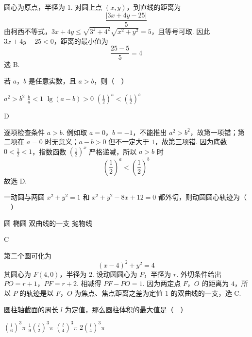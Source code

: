 \documentclass[UTF8,a4paper,oneside,11pt]{ctexbook}
\begin{document}
\begin{solution}
圆心为原点，半径为 \(1\). 对圆上点 \((x,y)\)，到直线的距离为
\[
\frac{|3x+4y-25|}{5}
\]
由柯西不等式，\(3x+4y\leq\sqrt{3^2+4^2}\sqrt{x^2+y^2}=5\)，且等号可取. 因此 \(3x+4y-25<0\)，距离的最小值为
\[
\frac{25-5}{5}=4
\]
选 B.
\end{solution}

\begin{problem}
若 \(a\)，\(b\) 是任意实数，且 \(a>b\)，则（\(\quad\)）

\choices
    {\(a^2>b^2\)}
    {\(\frac{b}{a}<1\)}
    {\(\lg \left(a-b\right)>0\)}
    {\(\left(\frac{1}{2}\right)^a<\left(\frac{1}{2}\right)^b\)}
\end{problem}

\begin{answer}
D
\end{answer}

\begin{solution}
逐项检查条件 \(a>b\). 例如取 \(a=0\)，\(b=-1\)，不能推出 \(a^2>b^2\)，故第一项错；第二项在 \(a=0\) 时无意义；\(a-b>0\) 但不一定大于 \(1\)，故第三项错. 因为底数 \(0<\frac12<1\)，指数函数 \(\left(\frac12\right)^x\) 严格递减，所以 \(a>b\) 时
\[
\left(\frac12\right)^a<\left(\frac12\right)^b
\]
故选 D.
\end{solution}

\begin{problem}
一动圆与两圆 \(x^2+y^2=1\) 和 \(x^2+y^2-8x+12=0\) 都外切，则动圆圆心轨迹为（\(\quad\)）

\choices
    {圆}
    {椭圆}
    {双曲线的一支}
    {抛物线}
\end{problem}

\begin{answer}
C
\end{answer}

\begin{solution}
第二个圆可化为
\[
(x-4)^2+y^2=4
\]
其圆心为 \(F(4,0)\)，半径为 \(2\). 设动圆圆心为 \(P\)，半径为 \(r\). 外切条件给出
\(PO=r+1\)，\(PF=r+2\).
相减得 \(PF-PO=1\). 因为两定点 \(F\)，\(O\) 的距离为 \(4\)，所以 \(P\) 的轨迹是以 \(F\)，\(O\) 为焦点、焦点距离之差为定值 \(1\) 的双曲线的一支，选 C.
\end{solution}

\begin{problem}
圆柱轴截面的周长 \(l\) 为定值，那么圆柱体积的最大值是（\(\quad\)）

\choices
    {\(\left(\frac{l}{6}\right)^3\pi\)}
    {\(\frac{1}{9}\left(\frac{l}{2}\right)^3\pi\)}
    {\(\left(\frac{l}{4}\right)^3\pi\)}
    {\(2\left(\frac{l}{4}\right)^3\pi\)}
\end{problem}
\end{document}
